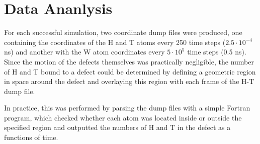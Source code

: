 \section{Data Ananlysis}

For each successful simulation, two coordinate dump files were produced, one containing the coordinates of the H and T atoms every 250 time steps ($2.5\cdot 10^{-4}$ ns) and another with the W atom coordinates every $5\cdot 10^5$ time steps (0.5 ns).
Since the motion of the defects themselves was practically negligible, the number of H and T bound to a defect could be determined by defining a geometric region in space around the defect and overlaying this region with each frame of the H-T dump file.

In practice, this was performed by parsing the dump files with a simple Fortran program, which checked whether each atom was located inside or outside the specified region and outputted the numbers of H and T in the defect as a functions of time.